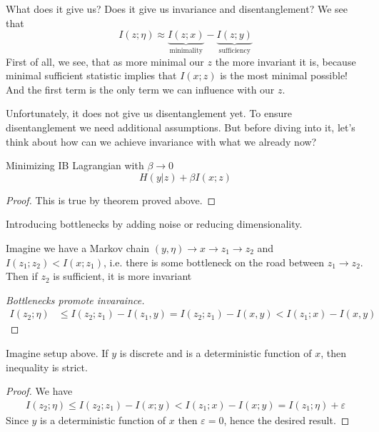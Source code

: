 \documentclass{article}
\begin{document}
What does it give us? Does it give us invariance and disentanglement?
We see that
\[
I(z;\eta) \approx \underbrace{I(z;x)}_{\text{minimality}} - \underbrace{I(z;y)}_\text{sufficiency}
\]
First of all, we see, that as more minimal our $z$ the more invariant it is, because minimal sufficient statistic implies that $I(x;z)$ is the most minimal possible!
And the first term is the only term we can influence with our $z$.

Unfortunately, it does not give us disentanglement yet.
To ensure disentanglement we need additional assumptions.
But before diving into it, let's think about how can we achieve invariance with what we already now?

\begin{corollary}
Minimizing IB Lagrangian with $\beta \to 0$
\[
H(y|z) + \beta I(x;z)
\]
\end{corollary}

\begin{proof}
This is true by theorem proved above.
\end{proof}

Introducing bottlenecks by adding noise or reducing dimensionality.
\begin{corollary}
Imagine we have a Markov chain $(y,\eta) \to x \to z_1 \to z_2$ and $I(z_1;z_2) < I(x; z_1)$, i.e. there is some bottleneck on the road between $z_1 \to z_2$. Then if $z_2$ is sufficient, it is more invariant    
\end{corollary}

\begin{proof}[Bottlenecks promote invaraince]
\begin{align*}
I(z_2;\eta) &\leq I(z_2;z_1) - I(z_1,y) = I(z_2; z_1) - I(x, y) < I(z_1; x) - I(x,y)
\end{align*}
\end{proof}

\begin{corollary}
Imagine setup above.
If $y$ is discrete and is a deterministic function of $x$, then inequality is strict.
\end{corollary}

\begin{proof}
We have
\[
\begin{split}
I(z_2; \eta) \leq I(z_2; z_1) - I(x;y) < I(z_1; x) - I(x;y) = I(z_1; \eta) + \varepsilon
\end{split}
\]
Since $y$ is a deterministic function of $x$ then $\varepsilon = 0$, hence the desired result.
\end{proof}
\end{document}
